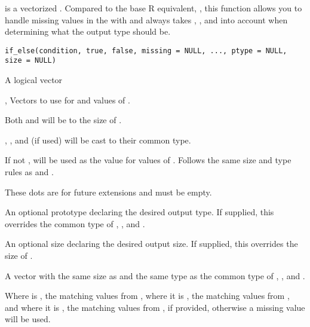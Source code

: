 %
\begin{Description}
 is a vectorized . Compared to the base R equivalent,
, this function allows you to handle missing values in the
 with  and always takes , , and 
into account when determining what the output type should be.
\end{Description}
%
\begin{Usage}
\begin{verbatim}
if_else(condition, true, false, missing = NULL, ..., ptype = NULL, size = NULL)
\end{verbatim}
\end{Usage}
%
\begin{Arguments}
\begin{ldescription}
\item[\code{condition}] A logical vector

\item[\code{true}, \code{false}] Vectors to use for  and  values of
.

Both  and  will be 
to the size of .

, , and  (if used) will be cast to their common type.

\item[\code{missing}] If not , will be used as the value for  values of
. Follows the same size and type rules as  and .

\item[\code{...}] These dots are for future extensions and must be empty.

\item[\code{ptype}] An optional prototype declaring the desired output type. If
supplied, this overrides the common type of , , and .

\item[\code{size}] An optional size declaring the desired output size. If supplied,
this overrides the size of .
\end{ldescription}
\end{Arguments}
%
\begin{Value}
A vector with the same size as  and the same type as the common
type of , , and .

Where  is , the matching values from , where it is
, the matching values from , and where it is , the matching
values from , if provided, otherwise a missing value will be used.
\end{Value}
